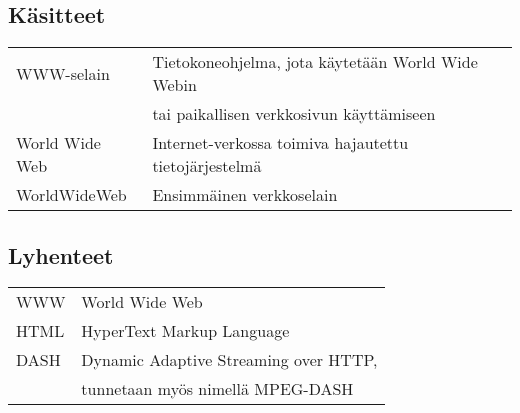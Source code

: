 \documentclass[finnish, 12pt, a4paper, elec, utf8, a-1b, online]{aaltothesis}
\date{XX.XX.2022}
\begin{document}
\makecoverpage{}

\makecopyrightpage{}

\begin{abstractpage}[finnish]
  \abstracttext{}
\end{abstractpage}


\newpage

\thesistableofcontents


\subsection*{Käsitteet}
\begin{tabular}{ll}
  WWW-selain      & Tietokoneohjelma, jota käytetään World Wide Webin \\
                  & tai paikallisen verkkosivun käyttämiseen \\
  World Wide Web  & Internet-verkossa toimiva hajautettu tietojärjestelmä \\
  WorldWideWeb    & Ensimmäinen verkkoselain
\end{tabular}

\subsection*{Lyhenteet}
\begin{tabular}{ll}
  WWW       & World Wide Web \\
  HTML      & HyperText Markup Language \\
  DASH      & Dynamic Adaptive Streaming over HTTP, \\
            & tunnetaan myös nimellä MPEG-DASH \\
\end{tabular}
\end{document}
